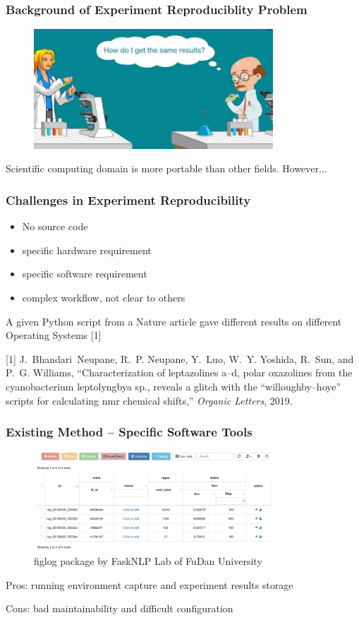 \documentclass[notheorems]{beamer}
\begin{document}
\begin{frame}
\frametitle{Background of Experiment Reproduciblity Problem}
\begin{figure}
\includegraphics[width=0.8\textwidth]{pic/reproducibility_in_Science.jpg}
\end{figure}
Scientific computing domain is more portable than other fields. However...
\end{frame}
\begin{frame}
\frametitle{Challenges in Experiment Reproducibility}
\begin{itemize}
\item No source code
\item specific hardware requirement
\item specific software requirement
\item complex workflow, not clear to others
\end{itemize}
\vskip 0.5cm

A given Python script from a Nature article gave different results on different Operating Systems [1]


\vskip 1cm
{\tiny [1] J.~Bhandari~Neupane, R.~P. Neupane, Y.~Luo, W.~Y. Yoshida, R.~Sun, and P.~G.
  Williams, ``Characterization of leptazolines a--d, polar oxazolines from the
  cyanobacterium leptolyngbya sp., reveals a glitch with the
  “willoughby--hoye” scripts for calculating nmr chemical shifts,''
  \emph{Organic Letters}, 2019.
 } 
 
\end{frame}

\begin{frame}
\frametitle{Existing Method -- Specific Software Tools}

\begin{figure}
\includegraphics[width=0.8\textwidth]{pic/fitlog_table.png}
\caption{figlog package by FaskNLP Lab of FuDan University}
\end{figure}
Pros: running environment capture and experiment results storage

Cons: bad maintainability and difficult configuration
\end{frame}
\end{document}
